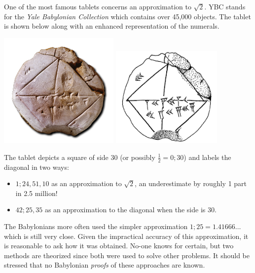 \label{ybc7289}

One of the most famous tablets concerns an approximation to $\sqrt 2$. YBC stands for the \emph{Yale Babylonian Collection} which contains over 45,000 objects. The tablet is shown below along with an enhanced representation of the numerals.
\begin{center}
\includegraphics[height=160pt]{YBC7289.png}\qquad
\includegraphics[height=140pt]{ybc.png}
\end{center}

The tablet depicts a square of side 30 (or possibly $\frac 12=0;30$) and labels the diagonal in two ways:
\begin{itemize}\itemsep0pt
  \item $1;24,51,10$ as an approximation to $\sqrt 2$, an underestimate by roughly 1 part in 2.5 million!
  \item $42;25,35$ as an approximation to the diagonal when the side is 30.
\end{itemize}
The Babylonians more often used the simpler approximation $1;25=1.41666\ldots$ which is still very close. Given the impractical accuracy of this approximation, it is reasonable to ask how it was obtained. No-one knows for certain, but two methods are theorized since both were used to solve other problems. It should be stressed that no Babylonian \emph{proofs} of these approaches are known.

